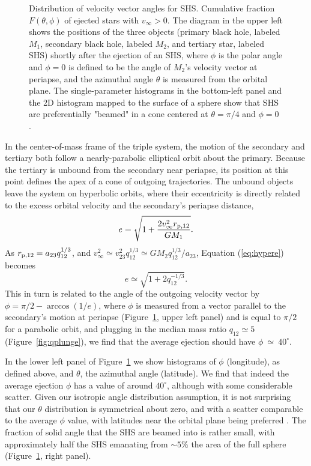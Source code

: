 \documentclass[a4paper,twocolumn]{emulateapj}
\begin{document}
{\begin{figure}
\begin{minipage}[b]{0.45\linewidth}
\end{minipage}
\caption{Distribution of velocity vector angles for SHS. Cumulative fraction $F(\theta, \phi)$ of ejected stars with $v_{\infty} > 0$. The diagram in the upper left shows the positions of the three objects (primary black hole, labeled $M_{1}$, secondary black hole, labeled $M_{2}$, and tertiary star, labeled SHS) shortly after the ejection of an SHS, where $\phi$ is the polar angle and $\phi = 0$ is defined to be the angle of $M_{2}$'s velocity vector at periapse, and the azimuthal angle $\theta$ is measured from the orbital plane. The single-parameter histograms in the bottom-left panel and the 2D histogram mapped to the surface of a sphere show that SHS are preferentially "beamed" in a cone centered at $\theta = \pi/4$ and $\phi = 0$ \citep[see][]{Zier:2001a,Sesana:2007a}.}
\label{fig:ejangles}
\end{figure}

In the center-of-mass frame of the triple system, the motion of the secondary and tertiary both follow a nearly-parabolic elliptical orbit about the primary. Because the tertiary is unbound from the secondary near periapse, its position at this point defines the apex of a cone of outgoing trajectories. The unbound objects leave the system on hyperbolic orbits, where their eccentricity is directly related to the excess orbital velocity and the secondary's periapse distance,
\begin{equation}
e = \sqrt{1 + \frac{2 v_{\infty}^{2} r_{\rm p,12}}{G M_{1}}}\label{eq:hypere}.
\end{equation}
As $r_{\rm p,12} = a_{23} q_{12}^{1/3}$, and $v_{\infty}^{2} \simeq v_{23}^{2} q_{12}^{1/3} \simeq G M_{2} q_{12}^{1/3} / a_{23}$, Equation (\ref{eq:hypere}) becomes
\begin{equation}
e \simeq \sqrt{1 + 2 q_{12}^{-1/3}}.
\end{equation}
This in turn is related to the angle of the outgoing velocity vector by $\phi = \pi/2 - \arccos (1/e)$, where $\phi$ is measured from a vector parallel to the secondary's motion at periapse (Figure~\ref{fig:ejangles}, upper left panel) and is equal to $\pi/2$ for a parabolic orbit, and plugging in the median mass ratio $q_{12} \simeq 5$ (Figure~\ref{fig:qplunge}), we find that the average ejection should have $\phi~\simeq~40^{\circ}$.

In the lower left panel of Figure~\ref{fig:ejangles} we show histograms of $\phi$ (longitude), as defined above, and $\theta$, the azimuthal angle (latitude). We find that indeed the average ejection $\phi$ has a value of around $40^{\circ}$, although with some considerable scatter. Given our isotropic angle distribution assumption, it is not surprising that our $\theta$ distribution is symmetrical about zero, and with a scatter comparable to the average $\phi$ value, with latitudes near the orbital plane being preferred \citep{Sesana:2006a}. The fraction of solid angle that the SHS are beamed into is rather small, with approximately half the SHS emanating from $\sim 5\%$ the area of the full sphere (Figure~\ref{fig:ejangles}, right panel).

}
\end{document}
